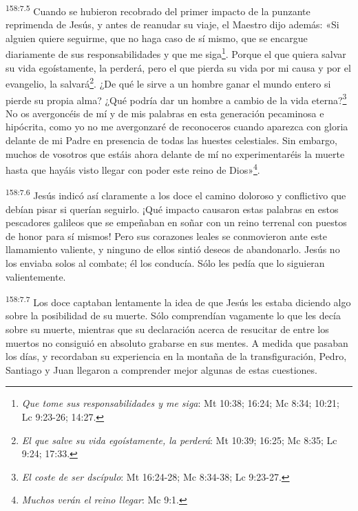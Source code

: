 {\par 
\textsuperscript{158:7.5} Cuando se hubieron recobrado del primer impacto de la punzante reprimenda de Jesús, y antes de reanudar su viaje, el Maestro dijo además: «Si alguien quiere seguirme, que no haga caso de sí mismo, que se encargue diariamente de sus responsabilidades y que me siga\footnote{\textit{Que tome sus responsabilidades y me siga}: Mt 10:38; 16:24; Mc 8:34; 10:21; Lc 9:23-26; 14:27.}. Porque el que quiera salvar su vida egoístamente, la perderá, pero el que pierda su vida por mi causa y por el evangelio, la salvará\footnote{\textit{El que salve su vida egoístamente, la perderá}: Mt 10:39; 16:25; Mc 8:35; Lc 9:24; 17:33.}. ¿De qué le sirve a un hombre ganar el mundo entero si pierde su propia alma? ¿Qué podría dar un hombre a cambio de la vida eterna?\footnote{\textit{El coste de ser dscípulo}: Mt 16:24-28; Mc 8:34-38; Lc 9:23-27.} No os avergoncéis de mí y de mis palabras en esta generación pecaminosa e hipócrita, como yo no me avergonzaré de reconoceros cuando aparezca con gloria delante de mi Padre en presencia de todas las huestes celestiales. Sin embargo, muchos de vosotros que estáis ahora delante de mí no experimentaréis la muerte hasta que hayáis visto llegar con poder este reino de Dios»\footnote{\textit{Muchos verán el reino llegar}: Mc 9:1.}.

\par 
\textsuperscript{158:7.6} Jesús indicó así claramente a los doce el camino doloroso y conflictivo que debían pisar si querían seguirlo. ¡Qué impacto causaron estas palabras en estos pescadores galileos que se empeñaban en soñar con un reino terrenal con puestos de honor para sí mismos! Pero sus corazones leales se conmovieron ante este llamamiento valiente, y ninguno de ellos sintió deseos de abandonarlo. Jesús no los enviaba solos al combate; él los conducía. Sólo les pedía que lo siguieran valientemente.

\par 
\textsuperscript{158:7.7} Los doce captaban lentamente la idea de que Jesús les estaba diciendo algo sobre la posibilidad de su muerte. Sólo comprendían vagamente lo que les decía sobre su muerte, mientras que su declaración acerca de resucitar de entre los muertos no consiguió en absoluto grabarse en sus mentes. A medida que pasaban los días, y recordaban su experiencia en la montaña de la transfiguración, Pedro, Santiago y Juan llegaron a comprender mejor algunas de estas cuestiones.

}

